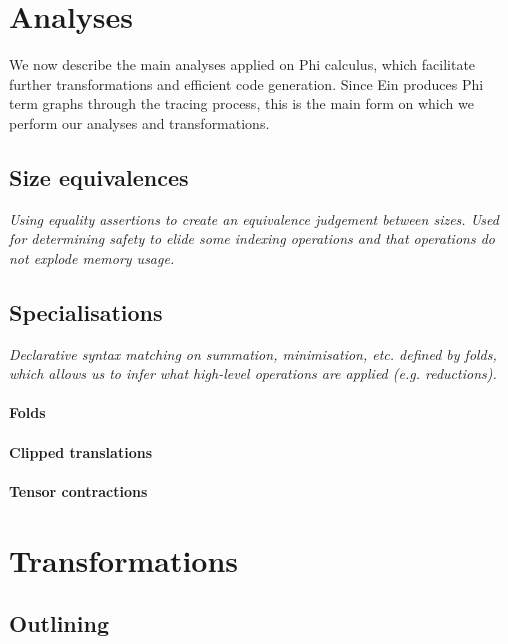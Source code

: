 \section{Analyses}

We now describe the main analyses applied on Phi calculus, which facilitate further transformations and efficient code generation. Since Ein produces Phi term graphs through the tracing process, this is the main form on which we perform our analyses and transformations.

\subsection{Size equivalences}

\textit{Using equality assertions to create an equivalence judgement between sizes. Used for determining safety to elide some indexing operations and that operations do not explode memory usage.}
\todothis

\subsection{Specialisations}

\textit{Declarative syntax matching on summation, minimisation, etc. defined by folds, which allows us to infer what high-level operations are applied (e.g. reductions).} \todothis

\paragraph{Folds}

\paragraph{Clipped translations}

\paragraph{Tensor contractions} 

\section{Transformations}

\subsection{Outlining}

